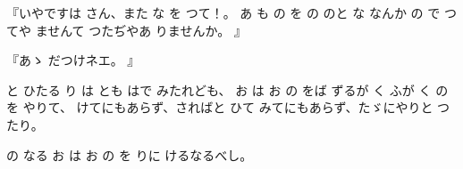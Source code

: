 
『いやですは
さん、また
な
を
つて！。
あ
も
の
を
の
のと
な
なんか
の
で
つてや
ませんて
つたぢやあ
りませんか。
』

『あゝ
だつけネエ。
』

と
ひたる
り
は
とも
はで
みたれども、
お
は
お
の
をば
ずるが
く
ふが
く
の
を
やりて、
けてにもあらず、さればと
ひて
みてにもあらず、たゞにやりと
つたり。

の
なる
お
は
お
の
を
りに
けるなるべし。

